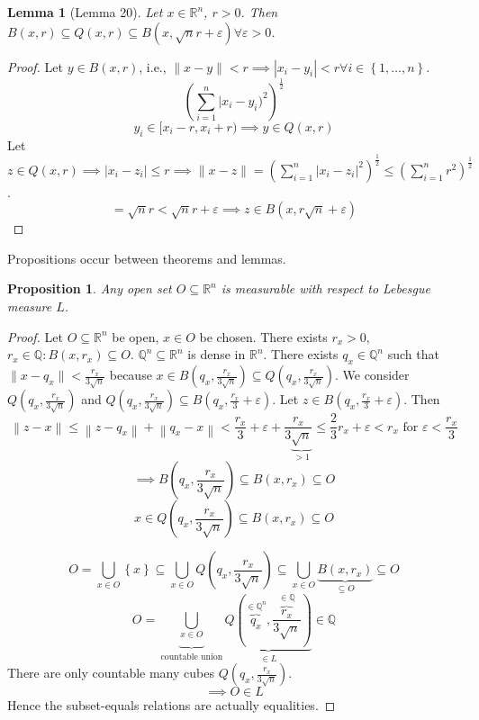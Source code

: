 \documentclass{article}
\newtheorem{lemma}{Lemma}  \numberwithin{lemma}{section}
\newtheorem{proposition}{Proposition}  \numberwithin{proposition}{section}
\newcommand{\set}[1]{\left\{#1\right\}}
\newcommand{\norm}[1]{\left\|#1\right\|}
\begin{document}
\begin{lemma}[Lemma 20]
  Let $x \in \mathbb R^n$, $r>0$. Then $B(x,r) \subseteq Q(x,r) \subseteq B(x, \sqrt{n} r + \varepsilon) \forall \varepsilon > 0$.
\end{lemma}
\begin{proof}
  Let $y \in B(x,r)$, i.e., $\|x - y\| < r \implies |x_i - y_i| < r \forall i \in \set{1,\ldots,n}$.
  \[ \left(\sum_{i=1}^n |x_i - y_i)^2\right)^{\frac12} \]
  \[ y_i \in [x_i - r, x_i + r) \implies y \in Q(x,r) \]
  Let $z \in Q(x,r) \implies |x_i - z_i| \leq r \implies \|x - z\| = \left(\sum_{i=1}^n |x_i - z_i|^2\right)^{\frac12} \leq \left(\sum_{i=1}^n r^2\right)^{\frac12}$.
  \[ = \sqrt{n} r < \sqrt{n}r + \varepsilon \implies z \in B(x, r\sqrt{n} + \varepsilon) \]
\end{proof}

Propositions occur between theorems and lemmas.

\begin{proposition}
  Any open set $O \subseteq \mathbb R^n$ is measurable with respect to Lebesgue measure $L$.
\end{proposition}
\begin{proof}
  Let $O \subseteq \mathbb R^n$ be open, $x \in O$ be chosen.
  There exists $r_x > 0$, $r_x \in \mathbb Q: B(x, r_x) \subseteq O$.
  $\mathbb Q^n \subseteq \mathbb R^n$ is dense in $\mathbb R^n$.
  There exists $q_x \in \mathbb Q^n$ such that $\|x - q_x\| < \frac{r_x}{3 \sqrt{n}}$
  because $x \in B(q_x, \frac{r_x}{3\sqrt{n}}) \subseteq Q(q_x, \frac{r_x}{3\sqrt{n}})$.
  We consider $Q(q_x, \frac{r_x}{3\sqrt{n}})$ and $Q(q_x, \frac{r_x}{3\sqrt{n}}) \subseteq B(q_x, \frac{r_x}{3} + \varepsilon)$.
  Let $z \in B(q_x, \frac{r_x}{3} + \varepsilon)$. Then
  \[ \norm{z - x} \leq \norm{z - q_x} + \norm{q_x - x} < \frac{r_x}{3} + \varepsilon + \frac{r_x}{3 \underbrace{\sqrt{n}}_{>1}} \leq \frac23 r_x + \varepsilon < r_x \text{ for } \varepsilon < \frac{r_x}{3} \]
  \[ \implies B\left(q_x, \frac{r_x}{3\sqrt{n}}\right) \subseteq B(x, r_x) \subseteq O \]
  \[ x \in Q\left(q_x, \frac{r_x}{3\sqrt{n}}\right) \subseteq B(x, r_x) \subseteq O \]

  \[ O = \bigcup_{x \in O} \set{x} \subseteq \bigcup_{x \in O} Q\left(q_x, \frac{r_x}{3\sqrt{n}}\right) \subseteq \bigcup_{x \in O} \underbrace{B(x, r_x)}_{\subseteq O} \subseteq O \]
  \[ O = \underbrace{\bigcup_{x \in O}}_{\text{countable union}} \underbrace{Q\left(\overbrace{q_x}^{\in \mathbb Q^n}, \frac{\overbrace{r_x}^{\in \mathbb Q}}{3\sqrt{n}}\right)}_{\in L} \in \mathbb Q \]
  There are only countable many cubes $Q\left(q_x, \frac{r_x}{3\sqrt{n}}\right)$.
  \[ \implies O \in L \]
  Hence the subset-equals relations are actually equalities.
\end{proof}
\end{document}
